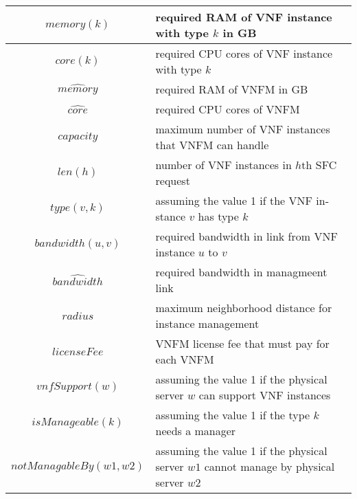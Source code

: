 \begin{center}\begin{latin}\begin{tabular}{|c|p{10cm}|}
    \hline
    \(memory(k)\) & required RAM of VNF instance with type \(k\) in GB \\
    \hline
    \(core(k)\) & required CPU cores of VNF instance with type \(k\) \\
    \hline
    \(\hat{memory}\) & required RAM of VNFM in GB \\
    \hline
    \(\hat{core}\) & required CPU cores of VNFM \\
    \hline
    \(capacity\) & maximum number of VNF instances that VNFM can handle \\
    \hline
    \(len(h)\) & number of VNF instances in \(h\)th SFC request \\
    \hline
    \(type(v, k)\) & assuming the value 1 if the VNF instance \(v\) has type \(k\)  \\
    \hline
    \(bandwidth(u, v)\) & required bandwidth in link from VNF instance \(u\) to \(v\) \\
    \hline
    \(\hat{bandwidth}\) & required bandwidth in managmeent link \\
    \hline
    \(radius\) & maximum neighborhood distance for instance management \\
    \hline
    \(licenseFee\) & VNFM license fee that must pay for each VNFM \\
    \hline
    \(vnfSupport(w)\) & assuming the value 1 if the physical server \(w\) can support VNF instances \\
    \hline
    \(isManageable(k)\) & assuming the value 1 if the type \(k\) needs a manager \\
    \hline
    \(notManagableBy(w1, w2)\) & assuming the value 1 if the physical server \(w1\) cannot manage by physical server \(w2\) \\
    \hline
\end{tabular}\end{latin}\end{center}


